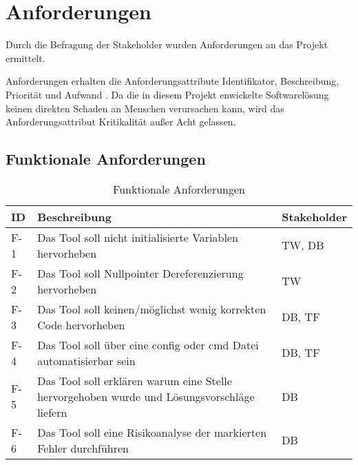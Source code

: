 \section{Anforderungen}
\label{sec:anforderungen}

Durch die Befragung der Stakeholder wurden Anforderungen an das Projekt ermittelt.

Anforderungen erhalten die Anforderungsattribute Identifikator, Beschreibung, Priorität und Aufwand
\cite[S.~479~f.]{Balzert:Lehrbuch-der-softwaretechnik}. Da die in diesem Projekt enwickelte Softwarelösung keinen direkten Schaden
an Menschen verursachen kann, wird das Anforderungsattribut \glqq{}Kritikalität\grqq{} außer Acht gelassen.

\subsection{Funktionale Anforderungen}
\label{subsec:funktional}

\begin{table}[H]
    {
        \begin{tabularx}{\linewidth}{|C{1cm}|X|C{2cm}|}
            \hline
            ID
             & Beschreibung
             & Stakeholder
            \\
            \hline
            F-1
             & Das Tool soll nicht initialisierte Variablen hervorheben
             & TW, DB
            \\
            F-2
             & Das Tool soll Nullpointer Dereferenzierung hervorheben
             & TW
            \\
            F-3
             & Das Tool soll keinen/möglichst wenig korrekten Code hervorheben
             & DB, TF
            \\
            F-4
             & Das Tool soll über eine config oder cmd Datei automatisierbar sein
             & DB, TF
            \\
            F-5
             & Das Tool soll erklären warum eine Stelle hervorgehoben wurde und Lösungsvorschläge liefern
             & DB
            \\
            F-6
             & Das Tool soll eine Risikoanalyse der markierten Fehler durchführen
             & DB
            \\
            \hline
        \end{tabularx}
    }
    \caption{Funktionale Anforderungen}
    \label{tab:funktional}
\end{table}

